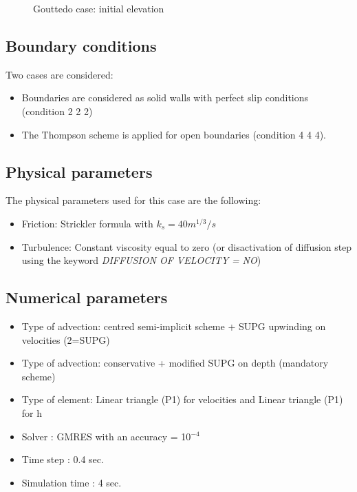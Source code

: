 \begin{figure}[H]
\begin{center}
\end{center}
\caption{Gouttedo case: initial elevation}
\label{fig:gouttedo_init}
\end{figure}

\subsection{Boundary conditions}

Two cases are considered:
\begin{itemize}
\item Boundaries are considered as solid walls with perfect slip conditions (condition 2 2 2)
\item The Thompson scheme is applied for open boundaries (condition 4 4 4).
\end{itemize}

\subsection{Physical parameters}
%
The physical parameters used for this case are the following:
\begin{itemize}
\item Friction: Strickler formula with $k_s = 40 m^{1/3}/s$
\item Turbulence: Constant viscosity equal to zero (or disactivation of
  diffusion step using the keyword  \textit{DIFFUSION OF VELOCITY =}\textit{
  NO})
\end{itemize}

\subsection{Numerical parameters}
\begin{itemize}
\item Type of advection: centred semi-implicit scheme + SUPG upwinding on
  velocities (2=SUPG)
\item Type of advection:  conservative + modified SUPG on depth (mandatory
  scheme)
\item  Type of element: Linear triangle (P1) for velocities and  Linear
  triangle (P1) for h
\item Solver : GMRES with an accuracy =  10${}^{-4}$
\item Time step : 0.4 sec.
\item Simulation time : 4 sec.
\end{itemize}

